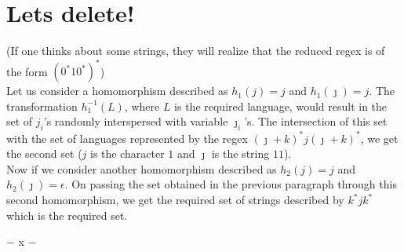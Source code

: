 \documentclass[11pt,letterpaper]{article}
\begin{document}
\section{Lets delete!}
(If one thinks about some strings, they will realize that the reduced regex is of the form $(0^*10^*)^*$) \\
Let us consider a homomorphism described as $h_1(j) = j$ and $h_1(\jmath) = j$. The transformation $h_1^{-1}(L)$, where $L$ is the required language, would result in the set of $j_i$'s randomly interspersed with variable $\jmath_i$'s.
The intersection of this set with the set of languages represented by the regex $(\jmath+k)^*j(\jmath+k)^*$, we get the second set ($j$ is the character $1$ and $\jmath$ is the string $11$). \\
Now if we consider another homomorphism described as $h_2(j) = j$ and $h_2(\jmath) = \epsilon$. On passing the set obtained in the previous paragraph through this second homomorphism, we get the required set of strings described by $k^*jk^*$ which is the required set.
\\
\begin{center}
    $-$ x $-$
\end{center}
\end{document}
